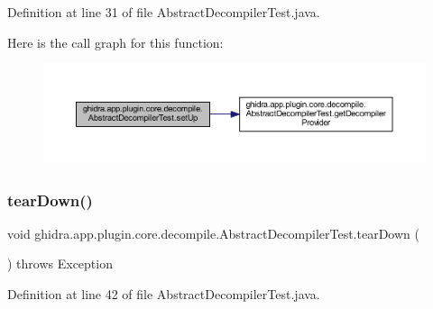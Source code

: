 Definition at line 31 of file Abstract\+Decompiler\+Test.\+java.

Here is the call graph for this function\+:
\nopagebreak
\begin{figure}[H]
\begin{center}
\leavevmode
\includegraphics[width=350pt]{classghidra_1_1app_1_1plugin_1_1core_1_1decompile_1_1_abstract_decompiler_test_a2954516a95013451596f225b6fca7977_cgraph}
\end{center}
\end{figure}
\mbox{\label{classghidra_1_1app_1_1plugin_1_1core_1_1decompile_1_1_abstract_decompiler_test_a153b27b741384bae8302270617332af7}} 
\subsubsection{\texorpdfstring{tearDown()}{tearDown()}}
{\footnotesize\ttfamily void ghidra.\+app.\+plugin.\+core.\+decompile.\+Abstract\+Decompiler\+Test.\+tear\+Down (\begin{DoxyParamCaption}{ }\end{DoxyParamCaption}) throws Exception\hspace{0.3cm}{\ttfamily [inline]}}



Definition at line 42 of file Abstract\+Decompiler\+Test.\+java.

